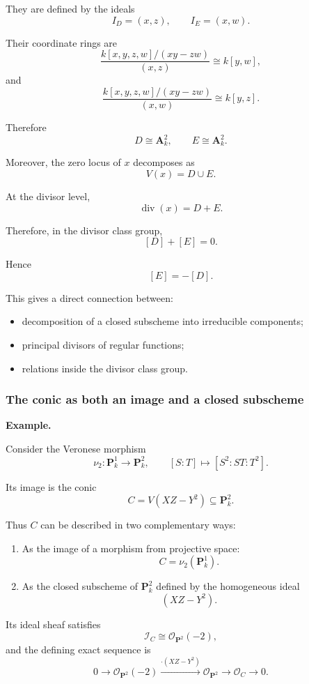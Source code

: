 \documentclass[12pt,a4paper]{article}
\theoremstyle{notespace}
\begin{document}
They are defined by the ideals
\[
I_D=(x,z),
\qquad
I_E=(x,w).
\]

Their coordinate rings are
\[
\frac{k[x,y,z,w]/(xy-zw)}{(x,z)}
\cong
k[y,w],
\]
and
\[
\frac{k[x,y,z,w]/(xy-zw)}{(x,w)}
\cong
k[y,z].
\]

Therefore
\[
D\cong\mathbf A^2_k,
\qquad
E\cong\mathbf A^2_k.
\]

Moreover, the zero locus of \(x\) decomposes as
\[
V(x)=D\cup E.
\]

At the divisor level,
\[
\operatorname{div}(x)=D+E.
\]

Therefore, in the divisor class group,
\[
[D]+[E]=0.
\]

Hence
\[
[E]=-[D].
\]

This gives a direct connection between:

\begin{itemize}
	\item decomposition of a closed subscheme into irreducible components;
	\item principal divisors of regular functions;
	\item relations inside the divisor class group.
\end{itemize}

\subsubsection{The conic as both an image and a closed subscheme}

\textbf{Example.}

Consider the Veronese morphism
\[
\nu_2:\mathbf P^1_k\longrightarrow\mathbf P^2_k,
\qquad
[S:T]\longmapsto[S^2:ST:T^2].
\]

Its image is the conic
\[
C=V(XZ-Y^2)\subseteq\mathbf P^2_k.
\]

Thus \(C\) can be described in two complementary ways:

\begin{enumerate}[label=\arabic*.]
	\item As the image of a morphism from projective space:
	\[
	C=\nu_2(\mathbf P^1_k).
	\]
	
	\item As the closed subscheme of \(\mathbf P^2_k\) defined by the homogeneous ideal
	\[
	(XZ-Y^2).
	\]
\end{enumerate}

Its ideal sheaf satisfies
\[
\mathcal I_C\cong\mathcal O_{\mathbf P^2}(-2),
\]
and the defining exact sequence is
\[
0
\longrightarrow
\mathcal O_{\mathbf P^2}(-2)
\xrightarrow{\cdot(XZ-Y^2)}
\mathcal O_{\mathbf P^2}
\longrightarrow
\mathcal O_C
\longrightarrow
0.
\]
\end{document}
